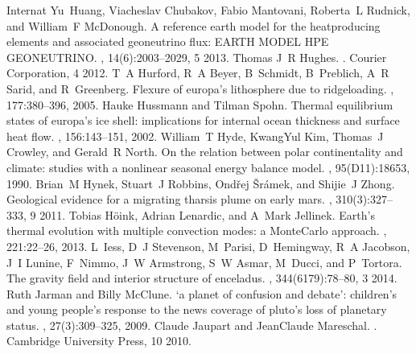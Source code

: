 \documentclass[letterpaper,10pt,english]{jupyterBook}
\begin{document}
\begin{sphinxthebibliography}{Internat}
\sphinxAtStartPar
Yu Huang, Viacheslav Chubakov, Fabio Mantovani, Roberta L Rudnick, and William F McDonough. A reference earth model for the heat\sphinxhyphen{}producing elements and associated geoneutrino flux: EARTH MODEL HPE GEONEUTRINO. , 14(6):2003–2029, 5 2013.
\sphinxAtStartPar
Thomas J R Hughes. . Courier Corporation, 4 2012.
\sphinxAtStartPar
T A Hurford, R A Beyer, B Schmidt, B Preblich, A R Sarid, and R Greenberg. Flexure of europa's lithosphere due to ridge\sphinxhyphen{}loading. , 177:380–396, 2005.
\sphinxAtStartPar
Hauke Hussmann and Tilman Spohn. Thermal equilibrium states of europa's ice shell: implications for internal ocean thickness and surface heat flow. , 156:143–151, 2002.
\sphinxAtStartPar
William T Hyde, Kwang\sphinxhyphen{}Yul Kim, Thomas J Crowley, and Gerald R North. On the relation between polar continentality and climate: studies with a nonlinear seasonal energy balance model. , 95(D11):18653, 1990.
\sphinxAtStartPar
Brian M Hynek, Stuart J Robbins, Ondřej Šrámek, and Shijie J Zhong. Geological evidence for a migrating tharsis plume on early mars. , 310(3):327–333, 9 2011.
\sphinxAtStartPar
Tobias Höink, Adrian Lenardic, and A Mark Jellinek. Earth's thermal evolution with multiple convection modes: a Monte\sphinxhyphen{}Carlo approach. , 221:22–26, 2013.
\sphinxAtStartPar
L Iess, D J Stevenson, M Parisi, D Hemingway, R A Jacobson, J I Lunine, F Nimmo, J W Armstrong, S W Asmar, M Ducci, and P Tortora. The gravity field and interior structure of enceladus. , 344(6179):78–80, 3 2014.
\sphinxAtStartPar
Ruth Jarman and Billy McClune. `a planet of confusion and debate': children's and young people's response to the news coverage of pluto's loss of planetary status. , 27(3):309–325, 2009.
\sphinxAtStartPar
Claude Jaupart and Jean\sphinxhyphen{}Claude Mareschal. . Cambridge University Press, 10 2010.

\end{sphinxthebibliography}
\end{document}
